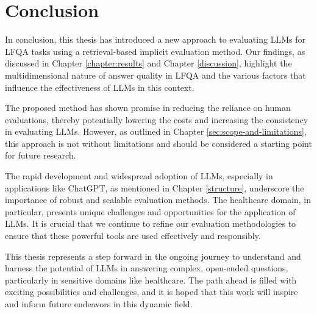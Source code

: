 \section{Conclusion}
In conclusion, this thesis has introduced a new approach to evaluating LLMs for LFQA tasks using a retrieval-based implicit evaluation method. Our findings, as discussed in Chapter \ref{chapter:results} and Chapter \ref{discussion}, highlight the multidimensional nature of answer quality in LFQA and the various factors that influence the effectiveness of LLMs in this context.

The proposed method has shown promise in reducing the reliance on human evaluations, thereby potentially lowering the costs and increasing the consistency in evaluating LLMs. However, as outlined in Chapter \ref{sec:scope-and-limitations}, this approach is not without limitations and should be considered a starting point for future research.

The rapid development and widespread adoption of LLMs, especially in applications like ChatGPT, as mentioned in Chapter \ref{structure}, underscore the importance of robust and scalable evaluation methods. The healthcare domain, in particular, presents unique challenges and opportunities for the application of LLMs. It is crucial that we continue to refine our evaluation methodologies to ensure that these powerful tools are used effectively and responsibly.

This thesis represents a step forward in the ongoing journey to understand and harness the potential of LLMs in answering complex, open-ended questions, particularly in sensitive domains like healthcare. The path ahead is filled with exciting possibilities and challenges, and it is hoped that this work will inspire and inform future endeavors in this dynamic field.

